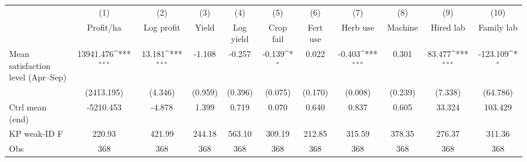 {
\def\sym#1{\ifmmode^{#1}\else\(^{#1}\)\fi}
\begin{tabular}{l*{10}{c}}
\toprule
                    &\multicolumn{1}{c}{(1)}&\multicolumn{1}{c}{(2)}&\multicolumn{1}{c}{(3)}&\multicolumn{1}{c}{(4)}&\multicolumn{1}{c}{(5)}&\multicolumn{1}{c}{(6)}&\multicolumn{1}{c}{(7)}&\multicolumn{1}{c}{(8)}&\multicolumn{1}{c}{(9)}&\multicolumn{1}{c}{(10)}\\
                    &\multicolumn{1}{c}{Profit/ha}&\multicolumn{1}{c}{Log profit}&\multicolumn{1}{c}{Yield}&\multicolumn{1}{c}{Log yield}&\multicolumn{1}{c}{Crop fail}&\multicolumn{1}{c}{Fert use}&\multicolumn{1}{c}{Herb use}&\multicolumn{1}{c}{Machine}&\multicolumn{1}{c}{Hired lab}&\multicolumn{1}{c}{Family lab}\\
\midrule
Mean satisfaction level (Apr--Sep)&   13941.476\sym{***}&      13.181\sym{***}&      -1.108         &      -0.257         &      -0.139\sym{*}  &       0.022         &      -0.403\sym{***}&       0.301         &      83.477\sym{***}&    -123.109\sym{*}  \\
                    &  (2413.195)         &     (4.346)         &     (0.959)         &     (0.396)         &     (0.075)         &     (0.170)         &     (0.008)         &     (0.239)         &     (7.338)         &    (64.786)         \\
\midrule
Ctrl mean (end)     &   -5210.453         &      -4.878         &       1.399         &       0.719         &       0.070         &       0.640         &       0.837         &       0.605         &      33.324         &     103.429         \\
KP weak-ID F        &      220.93         &      421.99         &      244.18         &      563.10         &      309.19         &      212.85         &      315.59         &      378.35         &      276.37         &      311.36         \\
Obs                 &         368         &         368         &         368         &         368         &         368         &         368         &         368         &         368         &         368         &         368         \\
\bottomrule
\end{tabular}
}
